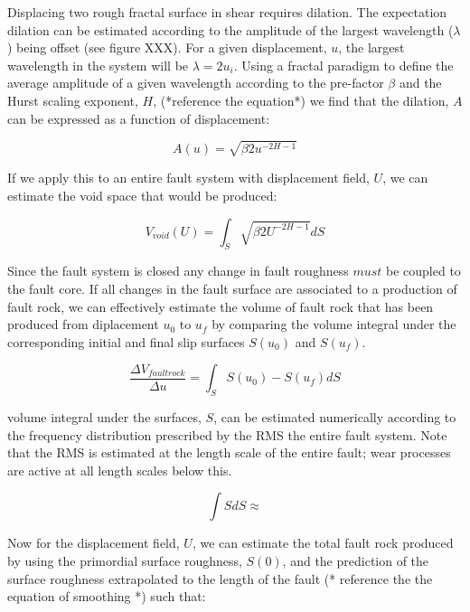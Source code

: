 \documentclass[12pt,a4paper]{article}
\begin{document}
\begin{itemize}
Displacing two rough fractal surface in shear requires dilation. The expectation dilation can be estimated according to the amplitude of the largest wavelength ($\lambda$) being offset (see figure XXX). For a given displacement, $u$, the largest wavelength in the system will be $\lambda = 2u_i$. Using a fractal paradigm to define the average amplitude of a given wavelength according to the pre-factor $\beta$ and the Hurst scaling exponent, $H$, (*reference the equation*) we find that the dilation, $A$ can be expressed as a function of displacement:

\begin{equation}
	A(u) = \sqrt{\beta 2u^{-2H-1}}
\end{equation}

If we apply this to an entire fault system with displacement field, $U$, we can estimate the void space that would be produced:

\begin{equation}
	V_{void}(U) = \int_S \sqrt{\beta 2U^{-2H-1}}dS
\end{equation}

Since the fault system is closed any change in fault roughness $must$ be coupled to the fault core. If all changes in the fault surface are associated to a production of fault rock, we can effectively estimate the volume of fault rock that has been produced from diplacement $u_0$ to $u_f$ by comparing the volume integral under the corresponding initial and final slip surfaces $S(u_0)$ and $S(u_f)$.

\begin{equation}
	\dfrac {\Delta V_{fault rock}}{\Delta u} = \int_S S(u_0) - S(u_f) dS
\end{equation}

volume integral under the surfaces, $S$, can be estimated numerically according to the frequency distribution prescribed by the RMS the  entire fault system. Note that the RMS is estimated at the length scale of the entire fault; wear processes are active at all length scales below this.

\begin{equation}
	\int S dS \approx 
\end{equation}

Now for the displacement field, $U$, we can estimate the total fault rock produced by using the primordial surface roughness, $S(0)$, and the prediction of the surface roughness extrapolated to the length of the fault (* reference the the equation of smoothing *) such that:


\end{itemize}
\end{document}
